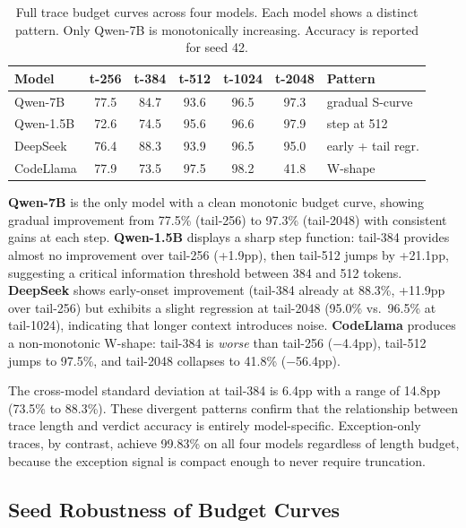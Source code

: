 \documentclass[11pt]{article}
\begin{document}
\begin{table}[t]
\centering
\caption{Full trace budget curves across four models. Each model shows a distinct pattern. Only Qwen-7B is monotonically increasing. Accuracy is reported for seed 42.}
\label{tab:budget}
\small
\begin{tabular}{lcccccl}
\toprule
\textbf{Model} & \textbf{t-256} & \textbf{t-384} & \textbf{t-512} & \textbf{t-1024} & \textbf{t-2048} & \textbf{Pattern} \\
\midrule
Qwen-7B & 77.5 & 84.7 & 93.6 & 96.5 & 97.3 & gradual S-curve \\
Qwen-1.5B & 72.6 & 74.5 & 95.6 & 96.6 & 97.9 & step at 512 \\
DeepSeek & 76.4 & 88.3 & 93.9 & 96.5 & 95.0 & early + tail regr. \\
CodeLlama & 77.9 & 73.5 & 97.5 & 98.2 & 41.8 & W-shape \\
\bottomrule
\end{tabular}
\end{table}

\textbf{Qwen-7B} is the only model with a clean monotonic budget curve, showing gradual improvement from 77.5\% (tail-256) to 97.3\% (tail-2048) with consistent gains at each step. \textbf{Qwen-1.5B} displays a sharp step function: tail-384 provides almost no improvement over tail-256 (+1.9pp), then tail-512 jumps by +21.1pp, suggesting a critical information threshold between 384 and 512 tokens. \textbf{DeepSeek} shows early-onset improvement (tail-384 already at 88.3\%, +11.9pp over tail-256) but exhibits a slight regression at tail-2048 (95.0\% vs.\ 96.5\% at tail-1024), indicating that longer context introduces noise. \textbf{CodeLlama} produces a non-monotonic W-shape: tail-384 is \emph{worse} than tail-256 ($-$4.4pp), tail-512 jumps to 97.5\%, and tail-2048 collapses to 41.8\% ($-$56.4pp).

The cross-model standard deviation at tail-384 is 6.4pp with a range of 14.8pp (73.5\% to 88.3\%). These divergent patterns confirm that the relationship between trace length and verdict accuracy is entirely model-specific. Exception-only traces, by contrast, achieve 99.83\% on all four models regardless of length budget, because the exception signal is compact enough to never require truncation.

\subsection{Seed Robustness of Budget Curves}
\label{sec:exp-seed-budget}
\end{document}
